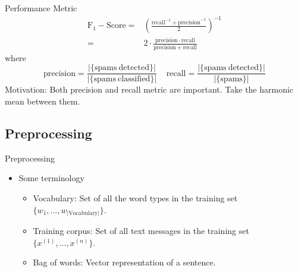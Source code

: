 \documentclass{beamer}
\begin{document}
\begin{frame}{Performance Metric}
\begin{equation}
	\begin{split}
		\mathrm{F_1-Score} =&
		\left(\frac{\mathrm{recall}^{-1} + \mathrm{precision}^{-1}}{2}\right)^{-1}\\
		=&
		2\cdot \frac{\mathrm{precision}\cdot \mathrm{recall}}{\mathrm{precision}+\mathrm{recall}}
	\end{split}
	\end{equation}
	where 
	\begin{equation*}
	\mathrm{precision} = \frac{|\{\mathrm{spams~detected}\}|}{|\{\mathrm{spams~classified}\}|}
	~~~~~
	\mathrm{recall} = \frac{|\{\mathrm{spams~detected}\}|}{|\{\mathrm{spams}\}|}
	\end{equation*}
	Motivation: Both precision and recall metric are important. Take the harmonic mean between them.
\end{frame}


\subsection{Preprocessing}

\begin{frame}{Preprocessing}
	\begin{itemize}
		\item Some terminology
		\begin{itemize}
			\item Vocabulary: Set of all the word types in the training set $\{w_1,...,w_{|\text{Vocabulary}|}\}$.
			\item Training corpus: Set of all text messages in the training set $\{x^{(1)},...,x^{(n)}\}$.
			\item Bag of words: Vector representation of a sentence.
		\end{itemize}
	\end{itemize}
\end{frame}
\end{document}
